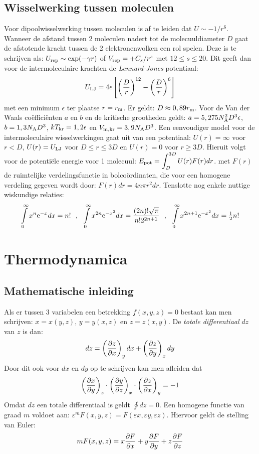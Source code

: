 \section{Wisselwerking tussen moleculen}
Voor dipoolwisselwerking tussen moleculen is af te leiden dat $U\sim-1/r^6$.
Wanneer de afstand tussen 2 moleculen nadert tot de molecuuldiameter $D$
gaat de afstotende kracht tussen de 2 elektronenwolken een rol spelen. Deze
is te schrijven als: $U_{\rm rep}\sim\exp(-\gamma r)$ of
$V_{\rm rep}=+C_s/r^s$ met $12\leq s\leq20$. Dit geeft dan voor de
intermoleculaire krachten de {\it Lennard-Jones} potentiaal:
\[
U_{\rm LJ}=4\epsilon\left[\left(\frac{D}{r}\right)^{12}-\left(\frac{D}{r}\right)^6\right]
\]
met een minimum $\epsilon$ ter plaatse $r=r_{\rm m}$. Er geldt:
$D\approx0,89r_{\rm m}$. Voor de Van der Waals co\"effici\"enten $a$ en $b$
en de kritische grootheden geldt: $a=5,275 N_{\rm A}^2D^3\epsilon$,
$b=1,3N_{\rm A}D^3$, $kT_{\rm kr}=1,2\epsilon$ en
$V_{\rm m,kr}=3,9N_{\rm A}D^3$.
\npar
Een eenvoudiger model voor de intermoleculaire wisselwerkingen gaat uit van
een potentiaal: $U(r)=\infty$ voor $r<D$, $U(r)=U_{\rm LJ}$ voor $D\leq
r\leq3D$ en $U(r)=0$ voor $r\geq3D$. Hieruit volgt voor de potenti\"ele
energie voor 1 molecuul: $\displaystyle E_{\rm pot}=\int_D^{3D}U(r)F(r)dr$.
\npar
met $F(r)$ de ruimtelijke verdelingsfunctie in bolco\"ordinaten, die voor een
homogene verdeling gegeven wordt door: $F(r)dr=4n\pi r^2dr$.
\npar
Tenslotte nog enkele nuttige wiskundige relaties:
\[
\int\limits_0^\infty x^n{\rm e}^{-x}dx=n!~~,~~
\int\limits_0^\infty x^{2n}{\rm e}^{-x^2}dx=\frac{(2n)!\sqrt{\pi}}{n!2^{2n+1}}~~,~~
\int\limits_0^\infty x^{2n+1}{\rm e}^{-x^2}dx=\mbox{$\frac{1}{2}$} n!
\]

\chapter{Thermodynamica}
\section{Mathematische inleiding}
Als er tussen 3 variabelen een betrekking $f(x,y,z)=0$ bestaat kan men
schrijven: $x=x(y,z)$, $y=y(x,z)$ en $z=z(x,y)$. De {\it totale differentiaal}
$dz$ van $z$ is dan:
\[
dz=\left(\frac{\partial z}{\partial x}\right)_{y}dx+\left(\frac{\partial z}{\partial y}\right)_{x}dy
\]
Door dit ook voor $dx$ en $dy$ op te schrijven kan men afleiden dat
\[
\left(\frac{\partial x}{\partial y}\right)_{z}\cdot\left(\frac{\partial y}{\partial z}\right)_{x}\cdot\left(\frac{\partial z}{\partial x}\right)_{y}=-1
\]
Omdat $dz$ een totale differentiaal is geldt $\oint dz=0$.
\npar
Een homogene functie van graad $m$ voldoet aan:
$\varepsilon^m F(x,y,z)=F(\varepsilon x,\varepsilon y,\varepsilon z)$.
Hiervoor geldt de stelling van Euler:
\[
mF(x,y,z)=x\frac{\partial F}{\partial x}+y\frac{\partial F}{\partial y}+z\frac{\partial F}{\partial z}
\]

